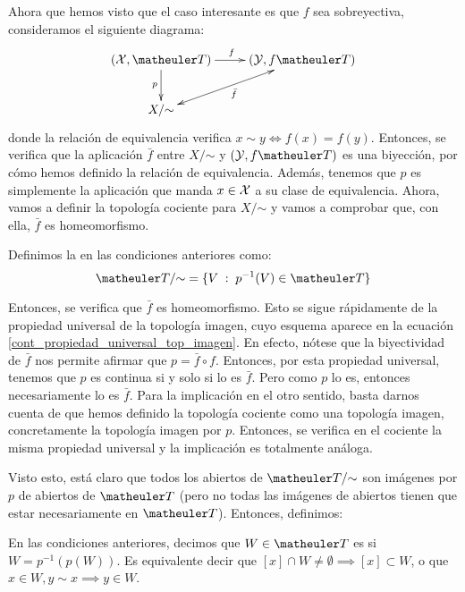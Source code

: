 


Ahora que hemos visto que el caso interesante es que $f$ sea sobreyectiva, consideramos el siguiente diagrama:
\[\xymatrix{
(\X,\T) \ar[r]^{f} \ar[d]_{p} &
(\mc{Y}, f\T) \ar@{<->}[ld]^{\bar{f}} \\
X/\mathord{\sim}
}\]
donde la relación de equivalencia verifica $x\sim y\iff f(x)=f(y)$. Entonces, se verifica que la aplicación $\bar{f}$ entre $X/\mathord{\sim}$ y $(\mc{Y},f\T)$ es una biyección, por cómo hemos definido la relación de equivalencia. Además, tenemos que $p$ es simplemente la aplicación que manda $x\in\mathcal{X}$ a su clase de equivalencia. Ahora, vamos a definir la topología cociente para $X/\mathord{\sim}$ y vamos a comprobar que, con ella, $\bar{f}$ es homeomorfismo.

\begin{defi}
Definimos la  en las condiciones anteriores como:
\[\T/\mathord{\sim} = \{V\midc p^{-1}(V)\in\T\}\]
\end{defi}

Entonces, se verifica que $\bar{f}$ es homeomorfismo. Esto se sigue rápidamente de la propiedad universal de la topología imagen, cuyo esquema aparece en la ecuación \ref{cont_propiedad_universal_top_imagen}. En efecto, nótese que la biyectividad de $\bar{f}$ nos permite afirmar que $p=\bar{f}\circ f$. Entonces, por esta propiedad universal, tenemos que $p$ es continua si y solo si lo es $\bar{f}$. Pero como $p$ lo es, entonces necesariamente lo es $\bar{f}$. Para la implicación en el otro sentido, basta darnos cuenta de que hemos definido la topología cociente como una topología imagen, concretamente la topología imagen por $p$. Entonces, se verifica en el cociente la misma propiedad universal y la implicación es totalmente análoga.

Visto esto, está claro que todos los abiertos de $\T/\mathord{\sim}$ son imágenes por $p$ de abiertos de $\T$ (pero no todas las imágenes de abiertos tienen que estar necesariamente en $\T$). Entonces, definimos:

\begin{defi}
En las condiciones anteriores, decimos que $W\in\T$ es  si $W=p^{-1}(p(W))$. Es equivalente decir que $[x]\cap W\neq\emptyset\implies [x]\subset W$, o que $x\in W,y\sim x\implies y\in W$.
\end{defi}

